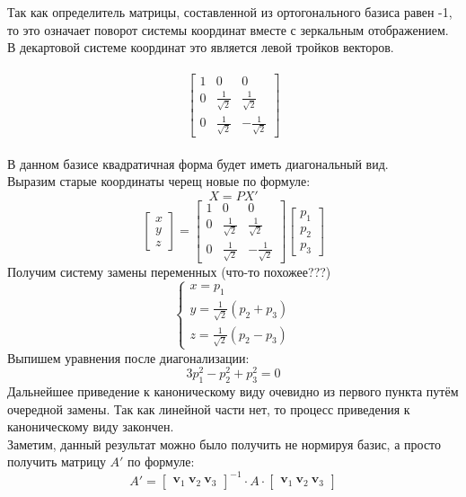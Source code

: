 \documentclass{article}
\begin{document}
Так как определитель матрицы, составленной из ортогонального базиса равен -1, то это означает поворот системы координат вместе с зеркальным отображением. В декартовой системе координат это является левой тройков векторов.
\\ \\
\[
\begin{bmatrix}
    1 & 0 & 0 \\
     0&\frac{1}{\sqrt{2}} & \frac{1}{\sqrt{2}}  \\
     0&\frac{1}{\sqrt{2}} & -\frac{1}{\sqrt{2}}
    \end{bmatrix}
    \]
\\В данном базисе квадратичная форма будет иметь диагональный вид.\\
Выразим старые координаты черещ новые по формуле:
\[
    X = P X'
\]
\[
    \begin{bmatrix}
        x \\
         y \\
         z
        \end{bmatrix} = \begin{bmatrix}
            1 & 0 & 0 \\
             0&\frac{1}{\sqrt{2}} & \frac{1}{\sqrt{2}}  \\
             0&\frac{1}{\sqrt{2}} & -\frac{1}{\sqrt{2}}
            \end{bmatrix} \begin{bmatrix}
                p_1 \\
                 p_2 \\
                 p_3
                \end{bmatrix}
\]
Получим систему замены переменных (что-то похожее???)
\[
    \begin{cases}
        x = p_1\\
        y = \frac{1}{\sqrt{2}}(p_2+p_3)\\
        z = \frac{1}{\sqrt{2}}(p_2-p_3)
    \end{cases}
\]
Выпишем уравнения после диагонализации:\\
\[
    3p_1^2-p_2^2+p_3^2=0
\]
Дальнейшее приведение к каноническому виду очевидно из первого пункта путём очередной замены. Так как линейной части нет, то процесс приведения к каноническому виду закончен.\\
Заметим, данный результат можно было получить не нормируя базис, а просто получить матрицу $A'$ по формуле:
\[
    A' = 
    \begin{bmatrix}
        \mathbf{v}_1\ 
        \mathbf{v}_2\
        \mathbf{v}_3
        \end{bmatrix}^{-1} \cdot A \cdot \begin{bmatrix}
            \mathbf{v}_1\ 
            \mathbf{v}_2\
            \mathbf{v}_3
            \end{bmatrix}
     \]
\end{document}
